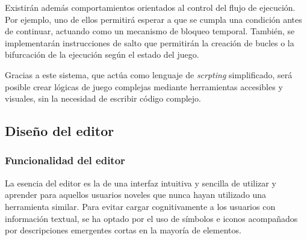 \medskip

Existirán además comportamientos orientados al control del flujo de ejecución. Por ejemplo, uno de ellos permitirá esperar a que se cumpla una condición antes de continuar, actuando como un mecanismo de bloqueo temporal. También, se implementarán instrucciones de salto que permitirán la creación de bucles o la bifurcación de la ejecución según el estado del juego.

\medskip

Gracias a este sistema, que actúa como lenguaje de \textit{scrpting} simplificado, será posible crear lógicas de juego complejas mediante herramientas accesibles y visuales, sin la necesidad de escribir código complejo.

\subsection{Diseño del editor}

\subsubsection{Funcionalidad del editor}

La esencia del editor es la de una interfaz intuitiva y sencilla de utilizar y aprender para aquellos usuarios noveles que nunca hayan utilizado una herramienta similar. Para evitar cargar cognitivamente a los usuarios con información textual, se ha optado por el uso de símbolos e iconos acompañados por descripciones emergentes cortas en la mayoría de elementos.

\medskip

